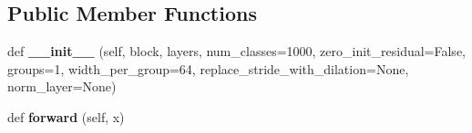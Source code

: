 \subsection*{Public Member Functions}
\begin{DoxyCompactItemize}
\item 
\mbox{\label{classtorchvision_1_1models_1_1resnet_1_1ResNet_ade5c973b86b1054535db7545f258dc61}} 
def {\bfseries \+\_\+\+\_\+init\+\_\+\+\_\+} (self, block, layers, num\+\_\+classes=1000, zero\+\_\+init\+\_\+residual=False, groups=1, width\+\_\+per\+\_\+group=64, replace\+\_\+stride\+\_\+with\+\_\+dilation=None, norm\+\_\+layer=None)
\item 
\mbox{\label{classtorchvision_1_1models_1_1resnet_1_1ResNet_af26d1f8955028af4b4118ca69631481d}} 
def {\bfseries forward} (self, x)
\end{DoxyCompactItemize}
